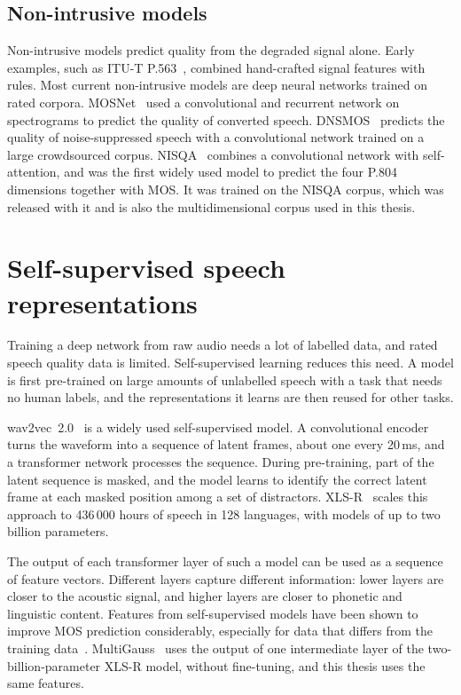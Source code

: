\documentclass[
english,                 %
bibtex,                  %
includeExtraAbstracts, %
]{kththesis}
\numberwithin{listing}{chapter}
\begin{document}
\subsection{Non-intrusive models}

Non-intrusive models predict quality from the degraded signal alone. Early examples, such as ITU-T P.563~\cite{itu_p563}, combined hand-crafted signal features with rules. Most current non-intrusive models are deep neural networks trained on rated corpora. MOSNet~\cite{lo_mosnet_2019} used a convolutional and recurrent network on spectrograms to predict the quality of converted speech. DNSMOS~\cite{reddy_dnsmos_2021} predicts the quality of noise-suppressed speech with a convolutional network trained on a large crowdsourced corpus. NISQA~\cite{mittag_nisqa_2021} combines a convolutional network with self-attention, and was the first widely used model to predict the four P.804 dimensions together with MOS. It was trained on the NISQA corpus, which was released with it and is also the multidimensional corpus used in this thesis.

\section{Self-supervised speech representations}
\label{sec:ssl}

Training a deep network from raw audio needs a lot of labelled data, and rated speech quality data is limited. Self-supervised learning reduces this need. A model is first pre-trained on large amounts of unlabelled speech with a task that needs no human labels, and the representations it learns are then reused for other tasks.

wav2vec~2.0~\cite{baevski_wav2vec2_2020} is a widely used self-supervised model. A convolutional encoder turns the waveform into a sequence of latent frames, about one every 20\,ms, and a transformer network processes the sequence. During pre-training, part of the latent sequence is masked, and the model learns to identify the correct latent frame at each masked position among a set of distractors. XLS-R~\cite{babu_xlsr_2022} scales this approach to 436\,000 hours of speech in 128 languages, with models of up to two billion parameters.

The output of each transformer layer of such a model can be used as a sequence of feature vectors. Different layers capture different information: lower layers are closer to the acoustic signal, and higher layers are closer to phonetic and linguistic content. Features from self-supervised models have been shown to improve MOS prediction considerably, especially for data that differs from the training data~\cite{cooper_bvcc_2022}. MultiGauss~\cite{cumlin_multigauss_2025} uses the output of one intermediate layer of the two-billion-parameter XLS-R model, without fine-tuning, and this thesis uses the same features.
\end{document}
